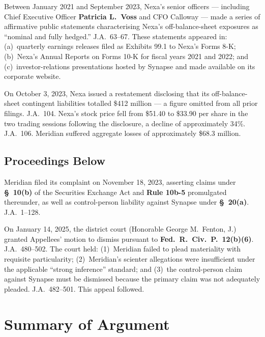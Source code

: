 \documentclass[12pt]{article}
\newcommand{\statute}[1]{\textbf{#1}}
\begin{document}
\vspace{8pt}

Between January 2021 and September 2023, Nexa's senior officers --- including Chief
Executive Officer \textbf{Patricia L.\ Voss} and CFO Calloway --- made a series of
affirmative public statements characterising Nexa's off-balance-sheet exposures as
``nominal and fully hedged.'' J.A.\ 63--67. These statements appeared in:
(a)~quarterly earnings releases filed as Exhibits 99.1 to Nexa's Forms 8-K;
(b)~Nexa's Annual Reports on Forms 10-K for fiscal years 2021 and 2022; and
(c)~investor-relations presentations hosted by Synapse and made available on its
corporate website.

On October 3, 2023, Nexa issued a restatement disclosing that its off-balance-sheet
contingent liabilities totalled \$412 million --- a figure omitted from all prior
filings. J.A.\ 104. Nexa's stock price fell from \$51.40 to \$33.90 per share in
the two trading sessions following the disclosure, a decline of approximately 34\%.
J.A.\ 106. Meridian suffered aggregate losses of approximately \$68.3 million.

\subsection{Proceedings Below}

Meridian filed its complaint on November 18, 2023, asserting claims under
\statute{\S\ 10(b)} of the Securities Exchange Act and \statute{Rule 10b-5}
promulgated thereunder, as well as control-person liability against Synapse
under \statute{\S\ 20(a)}. J.A.\ 1--128.

On January 14, 2025, the district court (Honorable George M.\ Fenton, J.) granted
Appellees' motion to dismiss pursuant to \statute{Fed.\ R.\ Civ.\ P.\ 12(b)(6)}.
J.A.\ 480--502. The court held: (1)~Meridian failed to plead materiality with
requisite particularity; (2)~Meridian's scienter allegations were insufficient under
the applicable ``strong inference'' standard; and (3)~the control-person claim
against Synapse must be dismissed because the primary claim was not adequately
pleaded. J.A.\ 482--501. This appeal followed.

\clearpage


\section{Summary of Argument}
\end{document}
